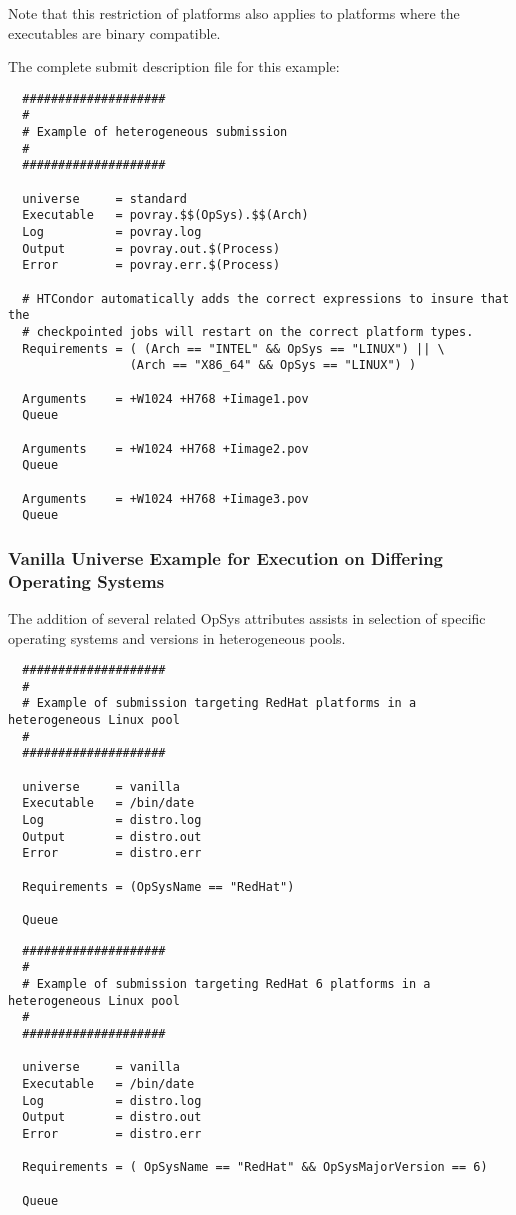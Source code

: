 Note that this restriction of platforms also applies to platforms where
the executables are binary compatible.

The complete submit description file for this example:

\begin{verbatim}
  ####################
  #
  # Example of heterogeneous submission
  #
  ####################

  universe     = standard
  Executable   = povray.$$(OpSys).$$(Arch)
  Log          = povray.log
  Output       = povray.out.$(Process)
  Error        = povray.err.$(Process)

  # HTCondor automatically adds the correct expressions to insure that the
  # checkpointed jobs will restart on the correct platform types.
  Requirements = ( (Arch == "INTEL" && OpSys == "LINUX") || \
                 (Arch == "X86_64" && OpSys == "LINUX") )

  Arguments    = +W1024 +H768 +Iimage1.pov
  Queue 

  Arguments    = +W1024 +H768 +Iimage2.pov
  Queue 

  Arguments    = +W1024 +H768 +Iimage3.pov
  Queue 
\end{verbatim}


\subsubsection{Vanilla Universe Example for Execution on Differing Operating Systems} 

The addition of several related OpSys attributes assists in selection of specific operating systems and versions in heterogeneous pools.


\begin{verbatim}
  ####################
  #
  # Example of submission targeting RedHat platforms in a heterogeneous Linux pool
  #
  ####################

  universe     = vanilla
  Executable   = /bin/date
  Log          = distro.log
  Output       = distro.out
  Error        = distro.err

  Requirements = (OpSysName == "RedHat")

  Queue
\end{verbatim}


\begin{verbatim}
  ####################
  #
  # Example of submission targeting RedHat 6 platforms in a heterogeneous Linux pool
  #
  ####################

  universe     = vanilla
  Executable   = /bin/date
  Log          = distro.log
  Output       = distro.out
  Error        = distro.err

  Requirements = ( OpSysName == "RedHat" && OpSysMajorVersion == 6)

  Queue
\end{verbatim}



